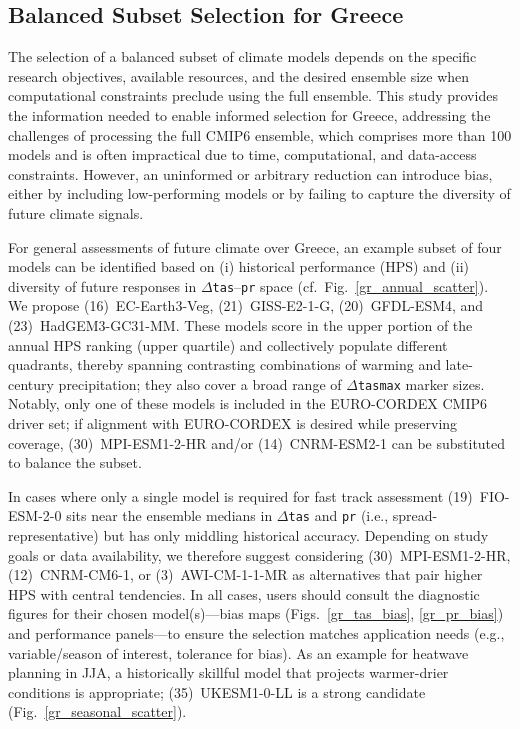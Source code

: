 \documentclass[pdflatex,sn-chicago]{sn-jnl}%
\theoremstyle{thmstyleone}%
\theoremstyle{thmstyletwo}%
\theoremstyle{thmstylethree}%
\begin{document}
\subsection{Balanced Subset Selection for Greece}
The selection of a balanced subset of climate models depends on the specific research objectives, available resources, and the desired ensemble size when computational constraints preclude using the full ensemble. This study provides the information needed to enable informed selection for Greece, addressing the challenges of processing the full CMIP6 ensemble, which comprises more than 100 models and is often impractical due to time, computational, and data-access constraints. However, an uninformed or arbitrary reduction can introduce bias, either by including low-performing models or by failing to capture the diversity of future climate signals.

For general assessments of future climate over Greece, an example subset of four models can be identified based on (i) historical performance (HPS) and (ii) diversity of future responses in \(\Delta\)\texttt{tas}--\texttt{pr} space (cf.\ Fig.~\ref{gr_annual_scatter}). We propose (16)~EC-Earth3-Veg, (21)~GISS-E2-1-G, (20)~GFDL-ESM4, and (23)~HadGEM3-GC31-MM. These models score in the upper portion of the annual HPS ranking (upper quartile) and collectively populate different quadrants, thereby spanning contrasting combinations of warming and late-century precipitation; they also cover a broad range of \(\Delta\)\texttt{tasmax} marker sizes. Notably, only one of these models is included in the EURO-CORDEX CMIP6 driver set; if alignment with EURO-CORDEX is desired while preserving coverage, (30)~MPI-ESM1-2-HR and/or (14)~CNRM-ESM2-1 can be substituted to balance the subset.

In cases where only a single model is required for fast track assessment (19)~FIO-ESM-2-0 sits near the ensemble medians in \(\Delta\)\texttt{tas} and \texttt{pr} (i.e., spread-representative) but has only middling historical accuracy. Depending on study goals or data availability, we therefore suggest considering (30)~MPI-ESM1-2-HR, (12)~CNRM-CM6-1, or (3)~AWI-CM-1-1-MR as alternatives that pair higher HPS with central tendencies. In all cases, users should consult the diagnostic figures for their chosen model(s)---bias maps (Figs.~\ref{gr_tas_bias}, \ref{gr_pr_bias}) and performance panels---to ensure the selection matches application needs (e.g., variable/season of interest, tolerance for bias). As an example for heatwave planning in JJA, a historically skillful model that projects warmer-drier conditions is appropriate; (35)~UKESM1-0-LL is a strong candidate (Fig.~\ref{gr_seasonal_scatter}).
\end{document}
